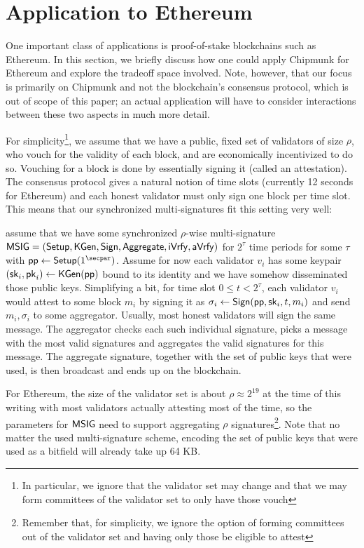\section{Application to Ethereum}\label{sec:ethereum}

One important class of applications is proof-of-stake blockchains such as Ethereum. %
In this section, we briefly discuss how one could apply Chipmunk for Ethereum and explore the tradeoff space involved.
Note, however, that our focus is primarily on Chipmunk and not the blockchain's consensus protocol, which is out of scope of this paper;
an actual application will have to consider interactions between these two aspects in much more detail.

For simplicity\footnote{In particular, we ignore that the validator set may change and that we may form committees of the validator set to only have those vouch}, we assume that we have a public, fixed set of validators of size $\rho$, who vouch for the validity of each block, and are economically incentivized to do so.
Vouching for a block is done by essentially signing it (called an attestation). The consensus protocol gives a natural notion of time slots (currently 12 seconds for Ethereum) and each honest validator must only sign one block per time slot. This means that our synchronized multi-signatures fit this setting very well:

assume that we have some synchronized $\rho$-wise multi-signature $\mathsf{MSIG} = (\mathsf{Setup}, \mathsf{KGen}, \mathsf{Sign}, \allowbreak \mathsf{Aggregate},\allowbreak \mathsf{iVrfy}, \mathsf{aVrfy})$ for $2^{\tau}$ time periods for some $\tau$ with $\params\gets\setup(1^{\secpar})$. Assume for now each validator $v_i$ has some keypair $(\mathsf{sk}_i,\mathsf{pk}_i)\gets \mathsf{KGen}(\mathsf{pp})$ bound to its identity and we have somehow disseminated those public keys.
Simplifying a bit, for time slot $0\leq t <2^\tau$, each validator $v_i$ would attest to some block $m_i$ by signing it as $\sigma_i\gets\mathsf{Sign}(\mathsf{pp},\mathsf{sk}_i,t,m_i)$ and send $m_i, \sigma_i$ to some aggregator. Usually, most honest validators will sign the same message. The aggregator checks each such individual signature, picks a message with the most valid signatures and aggregates the valid signatures for this message. The aggregate signature, together with the set of public keys that were used, is then broadcast and ends up on the blockchain.

For Ethereum, the size of the validator set is about $\rho\approx 2^{19}$ at the time of this writing with most validators actually attesting most of the time, so the parameters for $\mathsf{MSIG}$ need to support aggregating $\rho$ signatures\footnote{Remember that, for simplicity, we ignore the option of forming committees out of the validator set and having only those be eligible to attest}. Note that no matter the used multi-signature scheme, encoding the set of public keys that were used as a bitfield will already take up 64 KB.

